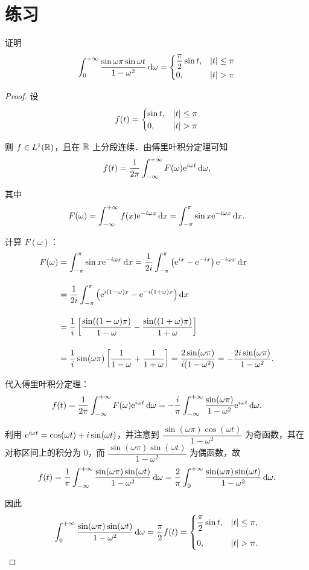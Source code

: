 \documentclass[12pt, a4paper, oneside, UTF8]{ctexbook}
\begin{document}
\section{练习}
\begin{exercise}
    证明
    \[
    \int_0^{+\infty} \frac{\sin \omega\pi\sin\omega t}{1-\omega^2}\,\mathrm{d}\omega = \begin{cases}
        \dfrac{\pi}{2}\sin t, & \abs{t}\le \pi\\
        0, & \abs{t}>\pi
    \end{cases}
    \]
\end{exercise}
\begin{proof}
    设
    \[
    f(t) = \begin{cases}
        \sin t, & \abs{t}\le \pi\\
        0, & \abs{t}>\pi
    \end{cases}
    \]

    则 $f\in L^1(\mathbb{R})$，且在 $\mathbb{R}$ 上分段连续．由傅里叶积分定理可知
    \[
    f(t) = \frac{1}{2\pi}\int_{-\infty}^{+\infty} F(\omega)\mathrm{e}^{i\omega t}\,\mathrm{d}\omega,
    \]

    其中
    \[
    F(\omega) = \int_{-\infty}^{+\infty} f(x)\mathrm{e}^{-i\omega x}\,\mathrm{d} x = \int_{-\pi}^{\pi} \sin x\mathrm{e}^{-i\omega x}\,\mathrm{d} x.
    \]

    计算 $F(\omega)$：
    \[
    \begin{aligned}
    F(\omega) &= \int_{-\pi}^{\pi} \sin x\mathrm{e}^{-i\omega x}\,\mathrm{d} x
    = \frac{1}{2i}\int_{-\pi}^{\pi}\left(\mathrm{e}^{ix}-\mathrm{e}^{-ix}\right)\mathrm{e}^{-i\omega x}\,\mathrm{d} x \\[1em]
    &= \frac{1}{2i}\int_{-\pi}^{\pi}\left(\mathrm{e}^{i(1-\omega)x}-\mathrm{e}^{-i(1+\omega)x}\right)\mathrm{d} x \\[1em]
    &= \frac{1}{i}\left[\frac{\sin((1-\omega)\pi)}{1-\omega}-\frac{\sin((1+\omega)\pi)}{1+\omega}\right] \\[1em]
    &= \frac{1}{i}\sin(\omega\pi)\left[\frac{1}{1-\omega}+\frac{1}{1+\omega}\right]
    = \frac{2\sin(\omega\pi)}{i(1-\omega^2)}
    = -\frac{2i\sin(\omega\pi)}{1-\omega^2}.
    \end{aligned}
    \]

    代入傅里叶积分定理：
    \[
    f(t) = \frac{1}{2\pi}\int_{-\infty}^{+\infty} F(\omega)\mathrm{e}^{i\omega t}\,\mathrm{d}\omega
    = -\frac{i}{\pi}\int_{-\infty}^{+\infty}\frac{\sin(\omega\pi)}{1-\omega^2}\mathrm{e}^{i\omega t}\,\mathrm{d}\omega.
    \]
    
    利用 $\mathrm{e}^{i\omega t}=\cos(\omega t)+i\sin(\omega t)$，并注意到
    $\dfrac{\sin(\omega\pi)\cos(\omega t)}{1-\omega^2}$ 为奇函数，其在对称区间上的积分为 0，而
    $\dfrac{\sin(\omega\pi)\sin(\omega t)}{1-\omega^2}$ 为偶函数，故
    \[
    f(t) = \frac{1}{\pi}\int_{-\infty}^{+\infty}\frac{\sin(\omega\pi)\sin(\omega t)}{1-\omega^2}\,\mathrm{d}\omega
    = \frac{2}{\pi}\int_{0}^{+\infty}\frac{\sin(\omega\pi)\sin(\omega t)}{1-\omega^2}\,\mathrm{d}\omega.
    \]
    
    因此
    \[
    \int_{0}^{+\infty}\frac{\sin(\omega\pi)\sin(\omega t)}{1-\omega^2}\,\mathrm{d}\omega
    = \frac{\pi}{2}f(t)
    = \begin{cases}
        \dfrac{\pi}{2}\sin t, & \abs{t}\le \pi,\\[1em]
        0, & \abs{t}>\pi.
    \end{cases}
    \]
\end{proof}

\ifx\allfiles\undefined
\end{document}
